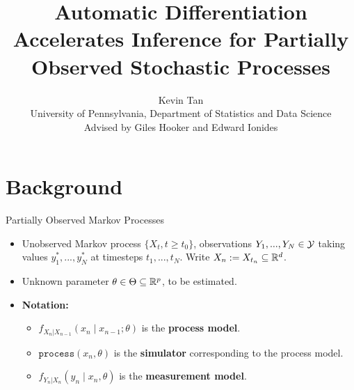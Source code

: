 \documentclass{beamer}
\title[AD for POMPs]{Automatic Differentiation Accelerates Inference for Partially Observed Stochastic Processes}
\author[Kevin Tan]{Kevin Tan \\ \small{University of Pennsylvania, Department of Statistics and Data Science\\\vspace{0.5cm} \small{Advised by Giles Hooker and Edward Ionides}}}
\begin{document}
\maketitle


\section{Background}


\begin{frame}{Partially Observed Markov Processes}

    \begin{itemize}
        \item Unobserved Markov process $\{X_t, t \geq t_0\}$, observations $Y_1,...,Y_N \in {\mathcal{Y}}$ taking values $y_1^*,...,y_N^*$ at timesteps $t_1,..., t_N$. Write $X_n := X_{t_n} \subseteq \mathbb{R}^d$.
        \item \pause Unknown parameter $\theta \in \Theta \subseteq \mathbb{R}^p$, to be estimated.
        \item \textbf{Notation:}
        \begin{itemize}
            \item $f_{X_n|X_{n-1}}\left(x_{n} \mid x_{n-1}; \theta\right)$ is the \textbf{process model}.
            \item \pause $\texttt{process}\left(x_n, \theta\right)$ is the \textbf{simulator} corresponding to the process model. 
            \item \pause $f_{Y_n|X_n}\left(y_n \mid x_n, \theta\right)$ is the \textbf{measurement model}.
        \end{itemize}
    \end{itemize}
\end{frame}
\end{document}
